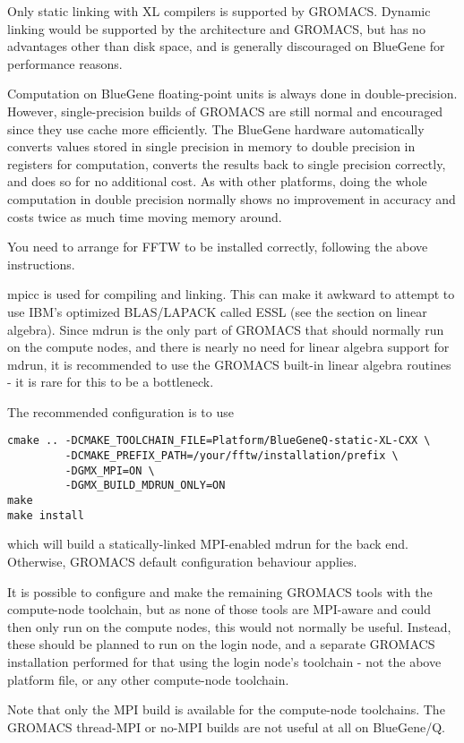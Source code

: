 \documentclass{article}[12pt,a4paper,twoside]
\newcommand{\gromacs}{GROMACS}
\newcommand{\mpi}{MPI}
\begin{document}
Only static linking with XL compilers is supported by \gromacs{}. Dynamic
linking would be supported by the architecture and \gromacs{}, but has no
advantages other than disk space, and is generally discouraged on
BlueGene for performance reasons.

Computation on BlueGene floating-point units is always done in
double-precision. However, single-precision builds of \gromacs{} are
still normal and encouraged since they use cache more efficiently. 
The BlueGene hardware automatically
converts values stored in single precision in memory to double
precision in registers for computation, converts the results back to
single precision correctly, and does so for no additional cost. As
with other platforms, doing the whole computation in double precision
normally shows no improvement in accuracy and costs twice as much time
moving memory around.

You need to arrange for FFTW to be installed correctly, following the
above instructions.

mpicc is used for compiling and linking. This can make it awkward to
attempt to use IBM's optimized BLAS/LAPACK called ESSL (see the
section on linear algebra). Since mdrun is the only part of \gromacs{}
that should normally run on the compute nodes, and there is nearly no
need for linear algebra support for mdrun, it is recommended to use
the \gromacs{} built-in linear algebra routines - it is rare for this
to be a bottleneck.

The recommended configuration is to use
\begin{verbatim}
cmake .. -DCMAKE_TOOLCHAIN_FILE=Platform/BlueGeneQ-static-XL-CXX \
         -DCMAKE_PREFIX_PATH=/your/fftw/installation/prefix \
         -DGMX_MPI=ON \
         -DGMX_BUILD_MDRUN_ONLY=ON
make
make install
\end{verbatim}
which will build a statically-linked \mpi{}-enabled mdrun for the back
end. Otherwise, GROMACS default configuration behaviour applies.

It is possible to configure and make the remaining \gromacs{} tools
with the compute-node toolchain, but as none of those tools are
\mpi{}-aware and could then only run on the compute nodes, this
would not normally be useful. Instead, these should be planned
to run on the login node, and a separate \gromacs{} installation
performed for that using the login node's toolchain - not the
above platform file, or any other compute-node toolchain.

Note that only the MPI build is available for the compute-node
toolchains. The GROMACS thread-MPI or no-MPI builds are not useful at
all on BlueGene/Q.
\end{document}
